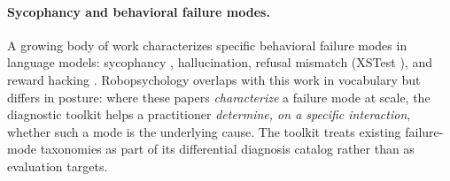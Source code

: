 \paragraph{Sycophancy and behavioral failure modes.}
A growing body of work characterizes specific behavioral failure modes
in language models: sycophancy \citep{sharma2023sycophancy,
perez2022discovering}, hallucination, refusal mismatch (XSTest
\citep{rottger2023xstest}), and reward hacking
\citep{lambert2024rewardbench}. Robopsychology overlaps with this work
in vocabulary but differs in posture: where these papers
\emph{characterize} a failure mode at scale, the diagnostic toolkit
helps a practitioner \emph{determine, on a specific interaction},
whether such a mode is the underlying cause. The toolkit treats
existing failure-mode taxonomies as part of its differential diagnosis
catalog rather than as evaluation targets.

